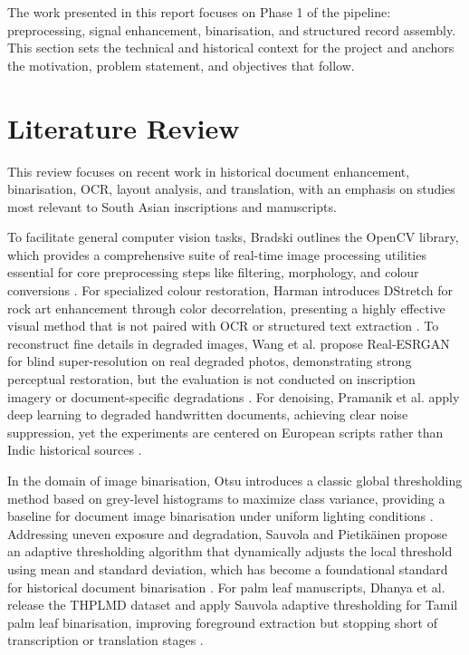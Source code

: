 The work presented in this report focuses on Phase 1 of the pipeline: preprocessing, signal enhancement, binarisation, and structured record assembly. This section sets the technical and historical context for the project and anchors the motivation, problem statement, and objectives that follow.

\section[Literature Review]{Literature Review}
This review focuses on recent work in historical document enhancement, binarisation, OCR, layout analysis, and translation, with an emphasis on studies most relevant to South Asian inscriptions and manuscripts.

To facilitate general computer vision tasks, Bradski outlines the OpenCV library, which provides a comprehensive suite of real-time image processing utilities essential for core preprocessing steps like filtering, morphology, and colour conversions \cite{OpenCV2000}. For specialized colour restoration, Harman introduces DStretch for rock art enhancement through color decorrelation, presenting a highly effective visual method that is not paired with OCR or structured text extraction \cite{Harman2008}. To reconstruct fine details in degraded images, Wang et al. propose Real-ESRGAN for blind super-resolution on real degraded photos, demonstrating strong perceptual restoration, but the evaluation is not conducted on inscription imagery or document-specific degradations \cite{Wang2021}. For denoising, Pramanik et al. apply deep learning to degraded handwritten documents, achieving clear noise suppression, yet the experiments are centered on European scripts rather than Indic historical sources \cite{Pramanik2021}.

In the domain of image binarisation, Otsu introduces a classic global thresholding method based on grey-level histograms to maximize class variance, providing a baseline for document image binarisation under uniform lighting conditions \cite{Otsu1979}. Addressing uneven exposure and degradation, Sauvola and Pietik{\"a}inen propose an adaptive thresholding algorithm that dynamically adjusts the local threshold using mean and standard deviation, which has become a foundational standard for historical document binarisation \cite{Sauvola2000}. For palm leaf manuscripts, Dhanya et al. release the THPLMD dataset and apply Sauvola adaptive thresholding for Tamil palm leaf binarisation, improving foreground extraction but stopping short of transcription or translation stages \cite{Dhanya2020}.

